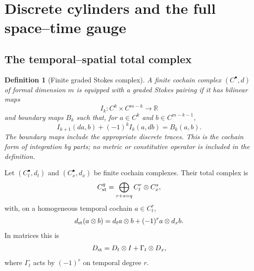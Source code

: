 \documentclass[11pt,a4paper]{article}
\newtheorem{definition}[theorem]{Definition}
\newcommand{\R}{\mathbb R}
\begin{document}
\section{Discrete cylinders and the full space--time gauge}

\subsection{The temporal--spatial total complex}

\begin{definition}[Finite graded Stokes complex]
\label{def:graded-stokes}
A finite cochain complex \((C^\bullet,d)\) of formal dimension \(m\) is
equipped with a graded Stokes pairing if it has bilinear maps
\[
 I_k:C^k\times C^{m-k}\to\R
\]
and boundary maps \(B_k\) such that, for
\(a\in C^k\) and \(b\in C^{m-k-1}\),
\begin{equation}\label{eq:graded-discrete-stokes}
 I_{k+1}(da,b)+(-1)^kI_k(a,db)=B_k(a,b).
\end{equation}
The boundary maps include the appropriate discrete traces.  This is the
cochain form of integration by parts; no metric or constitutive operator
is included in the definition.
\end{definition}

Let \((C_t^\bullet,d_t)\) and \((C_x^\bullet,d_x)\) be finite cochain
complexes.  Their total complex is
\begin{equation}\label{eq:total-complex}
 C_{\rm st}^q=\bigoplus_{r+s=q}C_t^r\otimes C_x^s,
\end{equation}
with, on a homogeneous temporal cochain \(a\in C_t^r\),
\begin{equation}\label{eq:total-differential}
 d_{\rm st}(a\otimes b)
 =d_ta\otimes b+(-1)^r a\otimes d_xb.
\end{equation}
In matrices this is
\begin{equation}\label{eq:total-differential-matrix}
 D_{\rm st}=D_t\otimes I+\Gamma_t\otimes D_x,
\end{equation}
where \(\Gamma_t\) acts by \((-1)^r\) on temporal degree \(r\).
\end{document}
